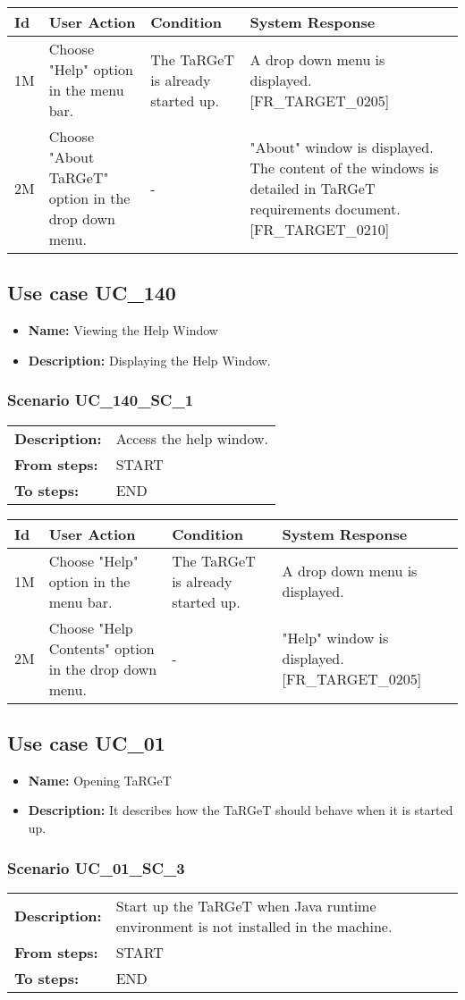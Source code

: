 \documentclass[a4paper,11pt]{article}
\newcommand{\bl}{\\ \hline}
\begin{document}
\begin{tabular}{|p{0.8in}|p{1.6in}|p{1.6in}|p{1.6in}|}
\hline
Id & User Action & Condition & System Response  \bl 
1M & Choose "Help" option in the menu bar. & The TaRGeT is already started up. & A drop down menu is displayed. [FR_TARGET_0205] \bl 
2M & Choose "About TaRGeT" option in the drop down menu. & - & "About" window is displayed. The content of the windows is detailed in TaRGeT requirements document. [FR_TARGET_0210] \bl 
\end{tabular}
\subsection*{Use case UC_140}
\begin{itemize}
\item {\bf Name: }Viewing the Help Window
\item {\bf Description: }Displaying the Help Window.
\end{itemize}
\subsubsection*{Scenario UC_140_SC_1}
\begin{tabular}{p{1in}p{4in}}
{\bf Description:} & Access the help window. \\
{\bf From steps:} & START \\
{\bf To steps:} & END \\
\end{tabular}
 
\begin{tabular}{|p{0.8in}|p{1.6in}|p{1.6in}|p{1.6in}|}
\hline
Id & User Action & Condition & System Response  \bl 
1M & Choose "Help" option in the menu bar. & The TaRGeT is already started up. & A drop down menu is displayed. \bl 
2M & Choose "Help Contents" option in the drop down menu. & - & "Help" window is displayed. [FR_TARGET_0205] \bl 
\end{tabular}
\subsection*{Use case UC_01}
\begin{itemize}
\item {\bf Name: }Opening TaRGeT
\item {\bf Description: }It describes how the TaRGeT should behave when it is started up.
\end{itemize}
\subsubsection*{Scenario UC_01_SC_3}
\begin{tabular}{p{1in}p{4in}}
{\bf Description:} & Start up the TaRGeT when Java runtime environment is not installed in the machine. \\
{\bf From steps:} & START \\
{\bf To steps:} & END \\
\end{tabular}
 
\end{document}
